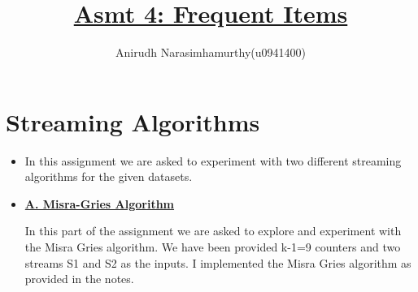 \documentclass[11pt]{article}
\title{\textbf{\underline{Asmt 4: Frequent Items}}}
\author{Anirudh Narasimhamurthy(u0941400)}
\begin{document}
\maketitle

\section{Streaming Algorithms}

\begin{itemize}
	
	
	\item[] In this assignment we are asked to experiment with two different streaming algorithms for the given datasets.
	
	\item[] \underline{\textbf{A.  Misra-Gries Algorithm}}
	
	In this part of the assignment we are asked to explore and experiment with the Misra Gries algorithm. We have been provided k-1=9 counters and two streams S1 and S2 as the inputs. I implemented the Misra Gries algorithm as provided in the notes.
	

\end{itemize}
\end{document}
